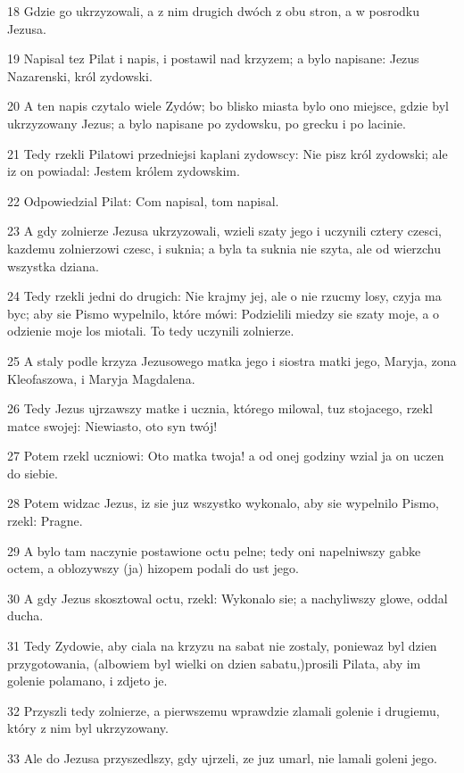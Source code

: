 \par 18 Gdzie go ukrzyzowali, a z nim drugich dwóch z obu stron, a w posrodku Jezusa.
\par 19 Napisal tez Pilat i napis, i postawil nad krzyzem; a bylo napisane: Jezus Nazarenski, król zydowski.
\par 20 A ten napis czytalo wiele Zydów; bo blisko miasta bylo ono miejsce, gdzie byl ukrzyzowany Jezus; a bylo napisane po zydowsku, po grecku i po lacinie.
\par 21 Tedy rzekli Pilatowi przedniejsi kaplani zydowscy: Nie pisz król zydowski; ale iz on powiadal: Jestem królem zydowskim.
\par 22 Odpowiedzial Pilat: Com napisal, tom napisal.
\par 23 A gdy zolnierze Jezusa ukrzyzowali, wzieli szaty jego i uczynili cztery czesci, kazdemu zolnierzowi czesc, i suknia; a byla ta suknia nie szyta, ale od wierzchu wszystka dziana.
\par 24 Tedy rzekli jedni do drugich: Nie krajmy jej, ale o nie rzucmy losy, czyja ma byc; aby sie Pismo wypelnilo, które mówi: Podzielili miedzy sie szaty moje, a o odzienie moje los miotali. To tedy uczynili zolnierze.
\par 25 A staly podle krzyza Jezusowego matka jego i siostra matki jego, Maryja, zona Kleofaszowa, i Maryja Magdalena.
\par 26 Tedy Jezus ujrzawszy matke i ucznia, którego milowal, tuz stojacego, rzekl matce swojej: Niewiasto, oto syn twój!
\par 27 Potem rzekl uczniowi: Oto matka twoja! a od onej godziny wzial ja on uczen do siebie.
\par 28 Potem widzac Jezus, iz sie juz wszystko wykonalo, aby sie wypelnilo Pismo, rzekl: Pragne.
\par 29 A bylo tam naczynie postawione octu pelne; tedy oni napelniwszy gabke octem, a oblozywszy (ja) hizopem podali do ust jego.
\par 30 A gdy Jezus skosztowal octu, rzekl: Wykonalo sie; a nachyliwszy glowe, oddal ducha.
\par 31 Tedy Zydowie, aby ciala na krzyzu na sabat nie zostaly, poniewaz byl dzien przygotowania, (albowiem byl wielki on dzien sabatu,)prosili Pilata, aby im golenie polamano, i zdjeto je.
\par 32 Przyszli tedy zolnierze, a pierwszemu wprawdzie zlamali golenie i drugiemu, który z nim byl ukrzyzowany.
\par 33 Ale do Jezusa przyszedlszy, gdy ujrzeli, ze juz umarl, nie lamali goleni jego.
